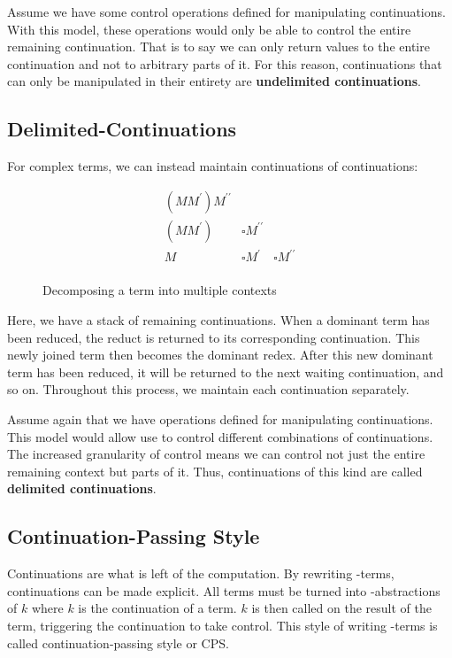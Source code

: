   Assume we have some control operations defined for manipulating
  continuations. With this model, these operations would only be able to 
  control the entire remaining continuation. That is to say we can only 
  return values to the entire continuation and not to arbitrary parts of 
  it. For this reason, continuations that can only be manipulated in their 
  entirety are \textbf{undelimited continuations}.

  \subsection{Delimited-Continuations}

  For complex terms, we can instead maintain continuations of continuations:
  
  \begin{figure}[!h]
    \[
    \begin{array}{lll}
      (MM^\prime) M^{\prime\prime} \\
      (MM^\prime) & \square M^{\prime\prime} \\
      M & \square M^\prime & \square M^{\prime\prime} \\
    \end{array}
    \]
  \caption{Decomposing a term into multiple contexts}
  \end{figure}

  Here, we have a stack of remaining continuations. When a dominant term
  has been reduced, the reduct is returned to its corresponding continuation. 
  This newly joined term then becomes the dominant redex. After this new 
  dominant term has been reduced, it will be returned to the next waiting 
  continuation, and so on. Throughout this process, we maintain each 
  continuation separately.
  
  Assume again that we have operations defined for manipulating continuations.
  This model would allow use to control different combinations of continuations.
  The increased granularity of control means we can control not just the
  entire remaining context but parts of it. Thus, continuations of this kind
  are called \textbf{delimited continuations}.

  \subsection{Continuation-Passing Style}
 
  Continuations are what is left of the computation. By rewriting 
  \lam-terms, continuations can be made explicit. All terms must
  be turned into \lam-abstractions of $k$ where $k$ is the continuation
  of a term. $k$ is then called on the result of the term, triggering
  the continuation to take control. This style of writing \lam-terms
  is called continuation-passing style or CPS.
  
